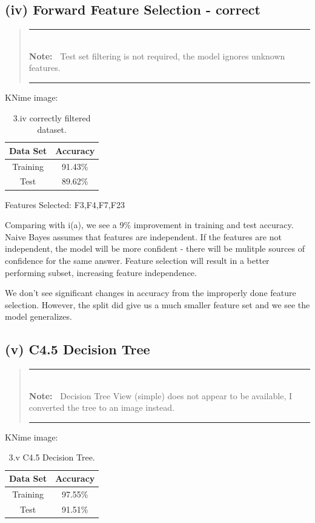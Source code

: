 \documentclass[11pt]{article}
\newlength{\Lnote}
\newcommand{\note}[1]
{\addtolength{\leftmargini}{4em}
	\settowidth{\Lnote}{\textbf{Note:~}}
	\begin{quote}
		\rule{\dimexpr\textwidth-2\leftmargini}{1pt}\\
		\mbox{}\hspace{-\Lnote}\textbf{Note:~}%
		#1\\[-0.5ex] 
		\rule{\dimexpr\textwidth-2\leftmargini}{1pt}
	\end{quote}
	\addtolength{\leftmargini}{-4em}}
\begin{document}
\subsection{(iv) Forward Feature Selection - correct}

\note{Test set filtering is not required, the model ignores unknown features.}

KNime image: 

\begin{table}[H]
	\centering
	\begin{tabular}{ | c | c | }
		\hline
		\textbf{Data Set} & \textbf{Accuracy} \\
		\hline
		Training & 91.43\% \\
		\hline
		Test & 89.62\% \\
		\hline
	\end{tabular}
	\caption{3.iv correctly filtered dataset.}
\end{table}

Features Selected: F3,F4,F7,F23

Comparing with i(a), we see a 9\% improvement in training and test accuracy. Naive Bayes assumes that features are independent. If the features are not independent, the model will be more confident - there will be mulitple sources of confidence for the same answer. Feature selection will result in a better performing subset, increasing feature independence. 

We don't see significant changes in accuracy from the improperly done feature selection. However, the split did give us a much smaller feature set and we see the model generalizes. 

\subsection{(v) C4.5 Decision Tree}

\note{Decision Tree View (simple) does not appear to be available, I converted the tree to an image instead.}

KNime image: 

\begin{table}[H]
	\centering
	\begin{tabular}{ | c | c | }
		\hline
		\textbf{Data Set} & \textbf{Accuracy} \\
		\hline
		Training & 97.55\% \\
		\hline
		Test & 91.51\% \\
		\hline
	\end{tabular}
	\caption{3.v C4.5 Decision Tree.}
\end{table}
\end{document}
